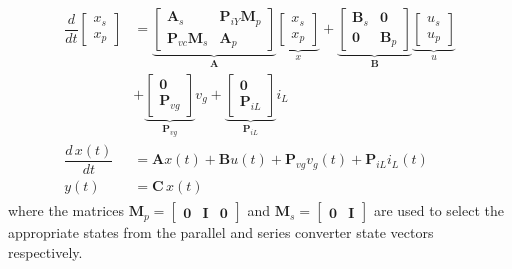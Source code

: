 \begin{align}
    \begin{aligned}
        \dfrac{d}{dt}
        \begin{bmatrix}
            x_s\\
            x_p
        \end{bmatrix}
        &=
        \underbrace{
        \begin{bmatrix}
            \mathbf{A}_s & \mathbf{P}_{iY}\mathbf{M}_p \\
            \mathbf{P}_{vc}\mathbf{M}_s & \mathbf{A}_p
        \end{bmatrix}
        }_{\mathbf{A}}
        \underbrace{
        \begin{bmatrix}
            x_s\\
            x_p
        \end{bmatrix}
        }_{x}
        +
        \underbrace{
        \begin{bmatrix}
            \mathbf{B}_s & \mathbf{0} \\
            \mathbf{0} & \mathbf{B}_p
        \end{bmatrix}
        }_{\mathbf{B}}
        \underbrace{
        \begin{bmatrix}
            u_s\\
            u_p 
        \end{bmatrix}
        }_{u}
        \\
        &+
        \underbrace{
        \begin{bmatrix}
            \mathbf{0}\\
            \mathbf{P}_{vg}
        \end{bmatrix}
        }_{\mathbf{P}_{vg}}
        v_g
        +
        \underbrace{
        \begin{bmatrix}
            \mathbf{0}\\
            \mathbf{P}_{iL}
        \end{bmatrix}
        }_{\mathbf{P}_{iL}}
        i_L\\
        \dfrac{d\, x(t)}{dt} &= \mathbf{A}x(t) + \mathbf{B}u(t) + \mathbf{P}_{vg}v_g(t) + \mathbf{P}_{iL}i_L(t)\\
        y(t) &= \mathbf{C}\,x(t)
    \end{aligned}
\end{align}
where the matrices $\mathbf{M}_p = \begin{bmatrix}\mathbf{0} & \mathbf{I} & \mathbf{0}\end{bmatrix}$ and $\mathbf{M}_s = \begin{bmatrix}\mathbf{0} & \mathbf{I}\end{bmatrix}$ are used to select the appropriate states from the parallel and series converter state vectors respectively.

